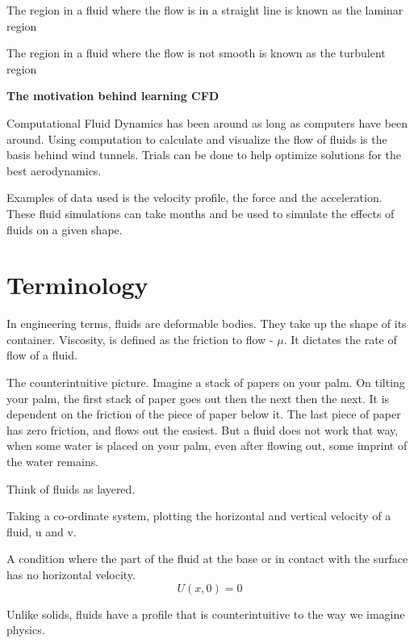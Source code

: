 \documentclass{report}
\begin{document}
\begin{definition}
The region in a fluid where the flow is in a straight line is known as the laminar region 
\end{definition}

\begin{definition}
The region in a fluid where the flow is not smooth is known as the turbulent region
\end{definition}

\textbf{The motivation behind learning CFD}

Computational Fluid Dynamics has been around as long as computers have been around. Using computation to calculate and visualize the flow of fluids is the basis behind wind tunnels. Trials can be done to help optimize solutions for the best aerodynamics.

Examples of data used is the velocity profile, the force and the acceleration. These fluid simulations can take months and be used to simulate the effects of fluids on a given shape.

\section{Terminology}
In engineering terms, fluids are deformable bodies. They take up the shape of its container. Viscosity, is defined as the friction to flow - $\mu$. It dictates the rate of flow of a fluid.

The counterintuitive picture. Imagine a stack of papers on your palm.  On tilting your palm, the first stack of paper goes out then the next then the next. It is dependent on the friction of the piece of paper below it. The last piece of paper has zero friction, and flows out the easiest. But a fluid does not work that way, when some water is placed on your palm, even after flowing out, some imprint of the water remains. 

Think of fluids as layered.

Taking a co-ordinate system, plotting the horizontal and vertical velocity of a fluid, u and v.

\begin{definition}
  A condition where the part of the fluid at the base or in contact with the surface has no horizontal velocity.
  \[
    U(x,0) = 0
  \]
\end{definition}

Unlike solids, fluids have a profile that is counterintuitive to the way we imagine physics.
\end{document}
